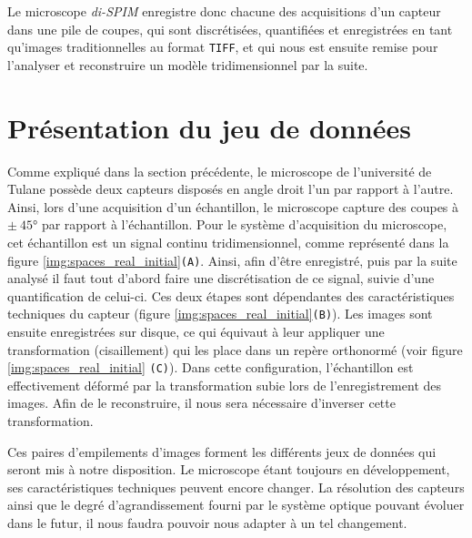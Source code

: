 {{		Le microscope \textit{di-SPIM} enregistre donc chacune des acquisitions d'un capteur dans une pile de coupes, qui sont discrétisées, quantifiées et enregistrées en tant qu'images traditionnelles au format \texttt{TIFF}, et qui nous est ensuite remise pour l'analyser et reconstruire un modèle tridimensionnel par la suite.
	}
	
	
    \section{Présentation du jeu de données}\label{section:dataset}
    {
        Comme expliqué dans la section précédente, le microscope de l'université de Tulane possède deux capteurs disposés en angle droit l'un par rapport à l'autre. Ainsi, lors d'une acquisition d'un échantillon, le microscope capture des coupes à $\pm~\ang{45}$ par rapport à l'échantillon. Pour le système d'acquisition du microscope, cet échantillon est un signal continu tridimensionnel, comme représenté dans la figure \ref{img:spaces_real_initial}\texttt{(A)}. Ainsi, afin d'être enregistré, puis par la suite analysé il faut tout d'abord faire une discrétisation de ce signal, suivie d'une quantification de celui-ci. Ces deux étapes sont dépendantes des caractéristiques techniques du capteur (figure \ref{img:spaces_real_initial}\texttt{(B)}). Les images sont ensuite enregistrées sur disque, ce qui équivaut à leur appliquer une transformation (cisaillement) qui les place dans un repère orthonormé (voir figure \ref{img:spaces_real_initial} \texttt{(C)}). Dans cette configuration, l'échantillon est effectivement déformé par la transformation subie lors de l'enregistrement des images. Afin de le reconstruire, il nous sera nécessaire d'inverser cette transformation.

        Ces paires d'empilements d'images forment les différents jeux de données qui seront mis à notre disposition. Le microscope étant toujours en développement, ses caractéristiques techniques peuvent encore changer. La résolution des capteurs ainsi que le degré d'agrandissement fourni par le système optique pouvant évoluer dans le futur, il nous faudra pouvoir nous adapter à un tel changement.

}}

